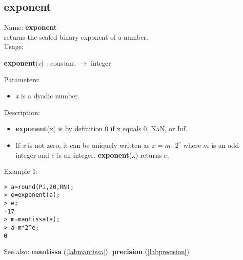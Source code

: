 \subsection{exponent}
\label{labexponent}
\noindent Name: \textbf{exponent}\\
returns the scaled binary exponent of a number.\\

\noindent Usage: 
\begin{center}
\textbf{exponent}(\emph{x}) : \textsf{constant} $\rightarrow$ \textsf{integer}\\
\end{center}
Parameters: 
\begin{itemize}
\item \emph{x} is a dyadic number.
\end{itemize}
\noindent Description: \begin{itemize}

\item \textbf{exponent}(x) is by definition 0 if x equals 0, NaN, or Inf.

\item If \emph{x} is not zero, it can be uniquely written as $x = m \cdot 2^e$ where
   $m$ is an odd integer and $e$ is an integer. \textbf{exponent}(x) returns $e$. 
\end{itemize}
\noindent Example 1: 
\begin{center}\begin{minipage}{15cm}\begin{Verbatim}[frame=single]
> a=round(Pi,20,RN);
> e=exponent(a);
> e;
-17
> m=mantissa(a);
> a-m*2^e;
0
\end{Verbatim}
\end{minipage}\end{center}
See also: \textbf{mantissa} (\ref{labmantissa}), \textbf{precision} (\ref{labprecision})
